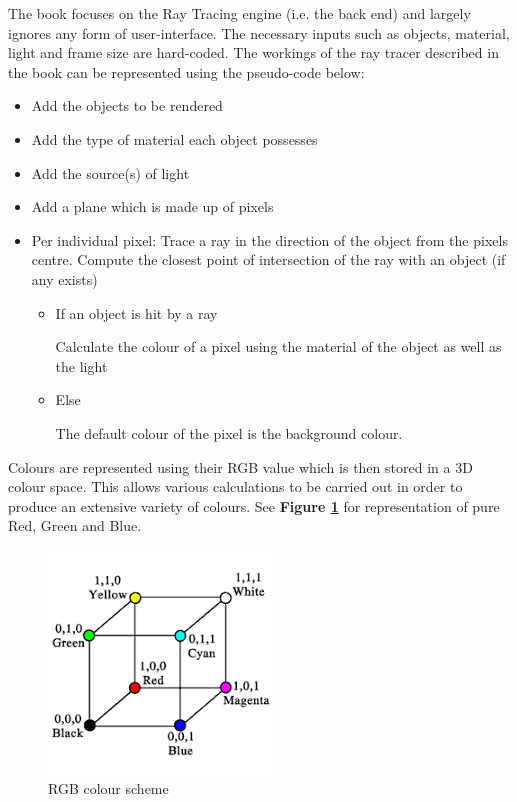 \documentclass[a4paper]{report}
\begin{document}
	\par The book focuses on the Ray Tracing engine (i.e. the back end) and largely ignores any form of user-interface. The necessary inputs such as objects, material, light and frame size are hard-coded. The workings of the ray tracer described in the book can be represented using the pseudo-code below:\newline
	\begin{itemize}
		\item Add the objects to be rendered
		\item Add the type of material each object possesses
		\item Add the source(s) of light 
		\item Add a plane which is made up of pixels
		\item Per individual pixel:\newline
		Trace a ray in the direction of the object from the pixels centre.\newline
		Compute the closest point of intersection of the ray with an object (if any exists)
		\begin{itemize}
			\item If an object is hit by a ray
			\par Calculate the colour of a pixel using the material of the object as well as the light 
			\item Else
			\par The default colour of the pixel is the background colour\cite{suffern_ray_2007}. 
		\end{itemize}
	\end{itemize} 
	
	\par Colours are represented using their RGB value which is then stored in a 3D colour space. This allows various calculations to be carried out in order to produce an extensive variety of colours. See \textbf{Figure \ref{fig:colour}} for representation of pure Red, Green and Blue.
	
	\begin{figure}[ht!]
		\centering
		\includegraphics[scale=0.60]{./colour.png}
		\caption{RGB colour scheme}
		\label{fig:colour}
	\end{figure}
	
\end{document}
